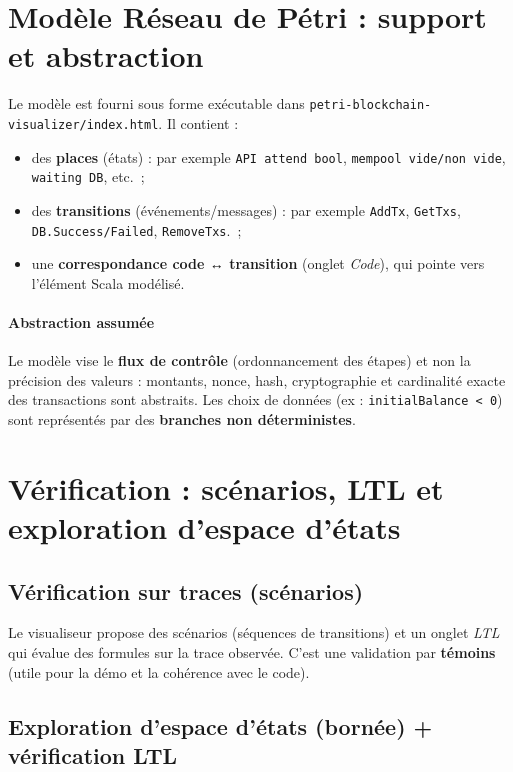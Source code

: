 \documentclass[11pt,a4paper]{article}
\begin{document}
\section{Modèle Réseau de Pétri : support et abstraction}\label{sec:petri}

Le modèle est fourni sous forme exécutable dans \texttt{petri-blockchain-visualizer/index.html}. Il contient :
\begin{itemize}[leftmargin=*]
  \item des \textbf{places} (états) : par exemple \texttt{API attend bool}, \texttt{mempool vide/non vide}, \texttt{waiting DB}, etc.\ ;
  \item des \textbf{transitions} (événements/messages) : par exemple \texttt{AddTx}, \texttt{GetTxs}, \texttt{DB.Success/Failed}, \texttt{RemoveTxs}.\ ;
  \item une \textbf{correspondance code ↔ transition} (onglet \emph{Code}), qui pointe vers l'élément Scala modélisé.
\end{itemize}

\paragraph{Abstraction assumée}
Le modèle vise le \textbf{flux de contrôle} (ordonnancement des étapes) et non la précision des valeurs : montants, nonce, hash, cryptographie et cardinalité exacte des transactions sont abstraits. Les choix de données (ex : \texttt{initialBalance < 0}) sont représentés par des \textbf{branches non déterministes}.

\section{Vérification : scénarios, LTL et exploration d'espace d'états}\label{sec:verif}

\subsection{Vérification sur traces (scénarios)}

Le visualiseur propose des scénarios (séquences de transitions) et un onglet \emph{LTL} qui évalue des formules sur la trace observée. C'est une validation par \textbf{témoins} (utile pour la démo et la cohérence avec le code).

\subsection{Exploration d'espace d'états (bornée) + vérification LTL}
\end{document}
